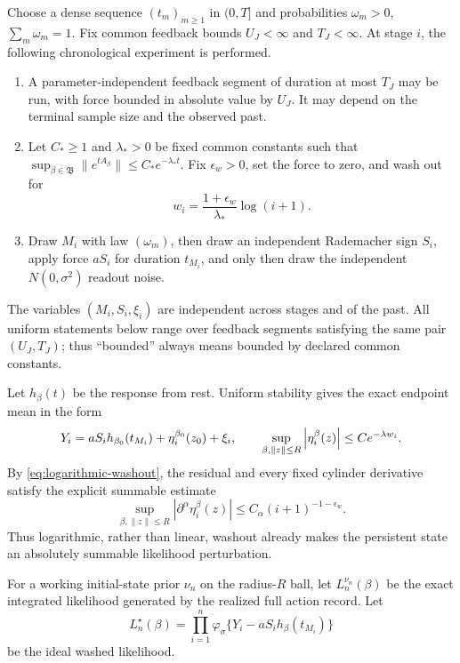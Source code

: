 Choose a dense sequence \((t_m)_{m\ge1}\) in \((0,T]\) and probabilities
\(\omega_m>0\), \(\sum_m\omega_m=1\).  Fix common feedback bounds
\(U_J<\infty\) and \(T_J<\infty\).  At stage \(i\), the following
chronological experiment is performed.
\begin{enumerate}
\item A parameter-independent feedback segment of duration at most \(T_J\)
may be run, with force bounded in absolute value by \(U_J\).  It may depend on
the terminal sample size and the observed past.
\item Let \(C_*\ge1\) and \(\lambda_*>0\) be fixed common constants
such that \(\sup_{\beta\in\mathfrak B}\|e^{tA_\beta}\|\le
C_*e^{-\lambda_*t}\).  Fix \(\epsilon_w>0\), set the force to zero, and
wash out for
\begin{equation}
 w_i=\frac{1+\epsilon_w}{\lambda_*}\log(i+1).
 \label{eq:logarithmic-washout}
\end{equation}
\item Draw \(M_i\) with law \((\omega_m)\), then draw an independent
Rademacher sign \(S_i\), apply force \(aS_i\) for duration \(t_{M_i}\), and
only then draw the independent \(N(0,\sigma^2)\) readout noise.
\end{enumerate}
The variables \((M_i,S_i,\xi_i)\) are independent across stages and of the
past.  All uniform statements below range over feedback segments satisfying
the same pair \((U_J,T_J)\); thus ``bounded'' always means bounded by declared
common constants.

Let \(h_\beta(t)\) be the response from rest.  Uniform stability gives the
exact endpoint mean in the form
\begin{equation}
 Y_i=aS_ih_{\beta_0}(t_{M_i})+\eta_i^{\beta_0}(z_0)+\xi_i,
 \qquad
 \sup_{\beta,\left\|z\right\|\le R}\left|\eta_i^\beta(z)\right|
 \le Ce^{-\lambda w_i}.
 \label{eq:washed-observation}
\end{equation}
By \eqref{eq:logarithmic-washout}, the residual and every fixed cylinder
derivative satisfy the explicit summable estimate
\begin{equation}
 \sup_{\beta,\|z\|\le R}|\partial^\alpha\eta_i^\beta(z)|
 \le C_\alpha(i+1)^{-1-\epsilon_w}.
 \label{eq:polynomial-washout-envelope}
\end{equation}
Thus logarithmic, rather than linear, washout already makes the persistent
state an absolutely summable likelihood perturbation.

For a working initial-state prior \(\nu_n\) on the radius-\(R\) ball, let
\(L_n^{\nu_n}(\beta)\) be the exact integrated likelihood generated by the
realized full action record.  Let
\[
 L_n^\star(\beta)=
 \prod_{i=1}^n
 \varphi_\sigma\{Y_i-aS_ih_\beta(t_{M_i})\}
\]
be the ideal washed likelihood.

